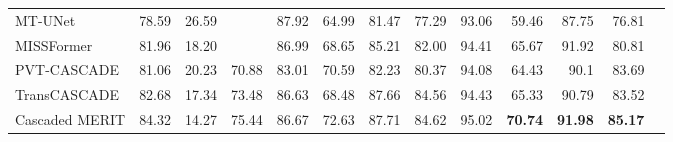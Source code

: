 \documentclass[10pt,twocolumn,letterpaper]{article}
\begin{document}
\begin{table*}[]
\begin{center}
{{\begin{tabular}{lrrrrrrrrrrrr}
MT-UNet \cite{wang2022mixed}                      & 78.59                    & 26.59             &        & 87.92                                      & 64.99                                   & 81.47                                        & 77.29                                        & 93.06                                     & 59.46                                  & 87.75                                   & 76.81                                  \\
MISSFormer \cite{huang2021missformer}                      & 81.96                    & 18.20             &        & 86.99                                      &  68.65                                   &  85.21                                        & 82.00                                        & 94.41                                      & 65.67                                   & 91.92                                   & 80.81                                   \\ 
PVT-CASCADE \cite{Rahman_2023_WACV}                  & 81.06                    & 20.23                    & 70.88                                     & 83.01                                      & 70.59                                   & 82.23                                        & 80.37                                        & 94.08                                      & 64.43                                   & 90.1                                    & 83.69                                   \\
TransCASCADE \cite{Rahman_2023_WACV}                & 82.68                    & 17.34                    & 73.48                                         & 86.63                                      & 68.48                                   & 87.66                                        & 84.56                                        & 94.43                                     & 65.33                                   & 90.79                                   & 83.52                                   \\
Cascaded MERIT \cite{rahman2023multi}                   & 84.32                    & 14.27    & 75.44                & 86.67                                      & 72.63                                   & 87.71                                       & 84.62                                        & 95.02                                      & \textbf{70.74}                                   &  \textbf{91.98}                                    & \textbf{85.17}                                   \\

\end{tabular}}}
\end{center}
\end{table*}
\end{document}
